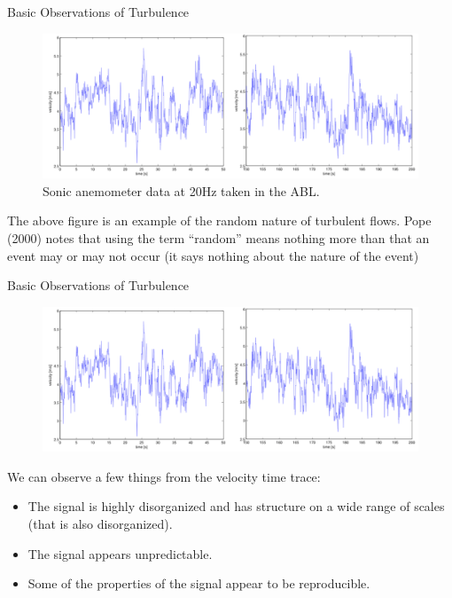 
\begin{frame}{Basic Observations of Turbulence}
  \begin{figure}[H]
  \centering
  \includegraphics[width=1\textwidth]{timetrace1.png}
  \caption{\scriptsize Sonic anemometer data at 20Hz taken in the ABL.}
  \end{figure}
  
  The above figure is an example of the random nature of turbulent flows. Pope (2000) notes that using the term ``random'' means nothing more than that an event may or may not occur (it says nothing about the nature of the event)
  
\end{frame}


\begin{frame}{Basic Observations of Turbulence}
  \begin{figure}[H]
  \centering
  \includegraphics[width=1\textwidth]{timetrace1.png}
  \end{figure}
  We can observe a few things from the velocity time trace:
  \begin{itemize}
  \item The signal is highly disorganized and has structure on a wide range of scales (that is also disorganized).
  \item The signal appears unpredictable.
  \item Some of the properties of the signal appear to be reproducible.
  \end{itemize}
\end{frame}

